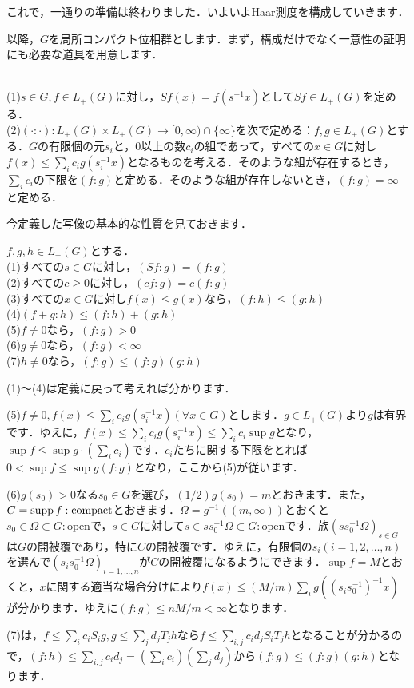 これで，一通りの準備は終わりました．いよいよHaar測度を構成していきます．

以降，$G$を局所コンパクト位相群とします．まず，構成だけでなく一意性の証明にも必要な道具を用意します．

\begin{ydefi}\label{17}
\leavevmode \\
(1)$s \in G, f \in L_{+}(G)$に対し，$Sf(x)=f(s^{-1}x)$として$Sf \in L_{+}(G)$を定める．\\
(2)$(\cdot : \cdot ) : L_{+}(G) \times L_{+}(G) \to [0, \infty) \cap \{ \infty \}$を次で定める：$f, g \in L_{+}(G)$とする．$G$の有限個の元$s_i$と，0以上の数$c_i$の組であって，すべての$x \in G$に対し$f(x) \le \sum_{i}c_{i} g(s_{i}^{-1}x)$となるものを考える．そのような組が存在するとき，$\sum_{i}c_i$の下限を$(f : g)$と定める．そのような組が存在しないとき，$(f : g)=\infty$と定める．
\end{ydefi}
今定義した写像の基本的な性質を見ておきます．
\begin{yprop}\label{18}
$f, g, h \in L_{+}(G)$とする．\\
(1)すべての$s \in G$に対し，$(Sf : g)=(f : g)$\\
(2)すべての$c \ge 0$に対し，$(cf : g)=c(f : g)$\\
(3)すべての$x \in G$に対し$f(x) \le g(x)$なら，$(f : h) \le (g : h)$\\
(4)$(f+g : h) \le (f : h)+(g : h)$\\
(5)$f \ne 0$なら，$( f : g ) > 0$\\
(6)$g \ne 0$なら，$( f : g ) < \infty $\\
(7)$h \ne 0$なら，$( f : g ) \le (f : g ) (g : h )$
\end{yprop}
\begin{Proof}
(1)〜(4)は定義に戻って考えれば分かります．

(5)$f \ne 0, f(x) \le \sum_{i}c_{i} g(s_{i}^{-1}x) (\forall x \in G)$とします．$g \in L_{+}(G)$より$g$は有界です．ゆえに，$f(x) \le \sum_{i}c_{i} g(s_{i}^{-1}x) \le \sum_{i}c_{i} \sup g$となり，$\sup f \le \sup g \cdot ( \sum_{i}c_{i} )$です．$c_i$たちに関する下限をとれば$0<\sup f \le \sup g (f : g )$となり，ここから(5)が従います．

(6)$g(s_{0}) > 0$なる$s_{0} \in G$を選び，$(1/2)g(s_{0})=m$とおきます．また，$C=\operatorname{supp} f : \mathrm{compact}$とおきます．$\Omega = g^{-1}( (m, \infty) )$とおくと$s_{0} \in \Omega \subset G : \mathrm{open}$で，$s \in G$に対して$s \in s s_{0}^{-1} \Omega \subset G : \mathrm{open}$です．族$( s s_{0}^{-1}\Omega )_{s \in G}$は$G$の開被覆であり，特に$C$の開被覆です．ゆえに，有限個の$ s_i(i=1,2, \ldots , n)$を選んで$( s_{i} s_{0}^{-1}\Omega )_{i=1,\ldots ,n}$が$C$の開被覆になるようにできます．$\sup f=M$とおくと，$x$に関する適当な場合分けにより$f(x) \le (M/m)\sum_{i} g( (s_{i} s_{0}^{-1}) ^{-1}x)$が分かります．ゆえに$(f : g ) \le nM/m < \infty $となります．

(7)は，$f \le \sum_{i} c_{i}S_{i}g, g \le \sum_{j} d_{j}T_{j}h$なら$f \le \sum_{i,j} c_{i}d_{j}S_iT_{j}h$となることが分かるので，$(f : h ) \le \sum_{i,j} c_{i}d_{j} = ( \sum_{i} c_{i} ) (\sum_{j} d_{j} )$から$( f : g ) \le (f : g ) (g : h )$となります．　
\end{Proof}

